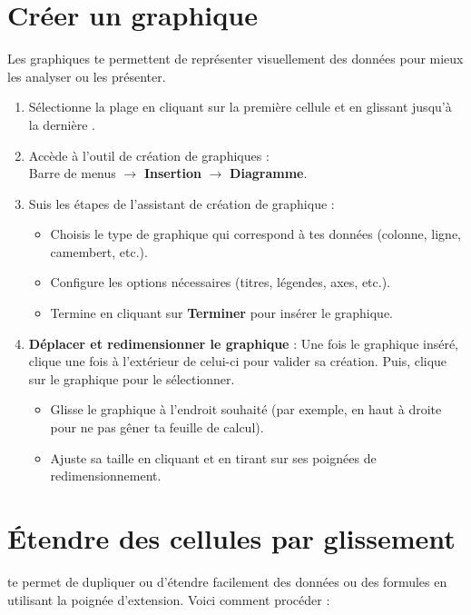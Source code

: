 \section{Créer un graphique}

Les graphiques te permettent de représenter visuellement des données pour mieux les analyser ou les présenter.

\begin{enumerate}
    \item Sélectionne la plage \cell[C17:E18] en cliquant sur la première cellule \cell[C17] et en glissant jusqu'à la dernière \cell[E2].
    \item Accède à l'outil de création de graphiques :\\
    Barre de menus $\rightarrow$ \textbf{Insertion} $\rightarrow$  \textbf{Diagramme}.
    \item Suis les étapes de l'assistant de création de graphique :
    \begin{itemize}
        \item Choisis le type de graphique qui correspond à tes données (colonne, ligne, camembert, etc.).
        \item Configure les options nécessaires (titres, légendes, axes, etc.).
        \item Termine en cliquant sur \textbf{Terminer} pour insérer le graphique.
    \end{itemize}
    \item \textbf{Déplacer et redimensionner le graphique} :
    Une fois le graphique inséré, clique une fois à l'extérieur de celui-ci pour valider sa création. Puis, clique sur le graphique pour le sélectionner.
    \begin{itemize}
        \item Glisse le graphique à l'endroit souhaité (par exemple, en haut à droite pour ne pas gêner ta feuille de calcul).
    \item Ajuste sa taille en cliquant et en tirant sur ses poignées de redimensionnement.
    \end{itemize}
\end{enumerate}

\section{Étendre des cellules par glissement}

\Calc te permet de dupliquer ou d'étendre facilement des données ou des formules en utilisant la poignée d'extension. Voici comment procéder :

